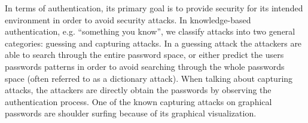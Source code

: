 

    In terms of authentication, its primary goal is to provide security for its intended environment in order to avoid security attacks. In knowledge-based authentication, e.g. ``something you know'', we classify attacks into two general categories: guessing and capturing attacks. In a guessing attack the attackers are able to search through the entire password space, or either predict the users passwords patterns in order to avoid searching through the whole passwords space (often referred to as a dictionary attack). When talking about capturing attacks, the attackers are directly obtain the passwords by observing the authentication process. One of the known capturing attacks on graphical passwords are shoulder surfing because of its graphical visualization. 







 
    